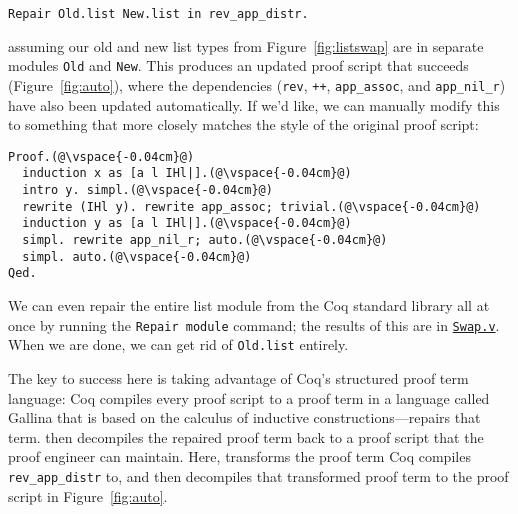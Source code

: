 \begin{lstlisting}
Repair Old.list New.list in rev_app_distr.
\end{lstlisting}
assuming our old and new list types from Figure~\ref{fig:listswap} are in separate modules \lstinline{Old} and \lstinline{New}.
This produces an updated proof script that succeeds (Figure~\ref{fig:auto}),
where the dependencies (\lstinline{rev}, \lstinline{++}, \lstinline{app_assoc}, and \lstinline{app_nil_r}) have
also been updated automatically.
If we'd like, we can manually modify this to something that more closely matches the style of the original proof script:

\begin{lstlisting}
Proof.(@\vspace{-0.04cm}@)
  induction x as [a l IHl|].(@\vspace{-0.04cm}@)
  intro y. simpl.(@\vspace{-0.04cm}@)
  rewrite (IHl y). rewrite app_assoc; trivial.(@\vspace{-0.04cm}@)
  induction y as [a l IHl|].(@\vspace{-0.04cm}@)
  simpl. rewrite app_nil_r; auto.(@\vspace{-0.04cm}@)
  simpl. auto.(@\vspace{-0.04cm}@)
Qed.
\end{lstlisting}
We can even repair the entire list module from the Coq standard library all at once by running the \lstinline{Repair module}
command; the results of this are in \href{https://github.com/uwplse/pumpkin-pi/blob/master/plugin/coq/Swap.v}{\lstinline{Swap.v}}.
When we are done, we can get rid of \lstinline{Old.list} entirely.

\begin{figure*}
\codeauto{}
\vspace{-0.3cm}
\caption{The automatically (denoted by $\codeauto{light blue}$) repaired proof of \lstinline{rev_app_distr} that \toolname produces.}
\label{fig:auto}
\end{figure*} %

The key to success here is taking advantage of Coq's structured proof term language:
Coq compiles every proof script to a proof term in a language called Gallina that is based on the calculus of inductive 
constructions---\toolname repairs that term.
\toolname then decompiles the repaired proof term back to a proof script that the proof engineer can maintain.
Here, \toolname transforms the proof term Coq compiles \lstinline{rev_app_distr} to,
and then decompiles that transformed proof term to the proof script in Figure~\ref{fig:auto}.

